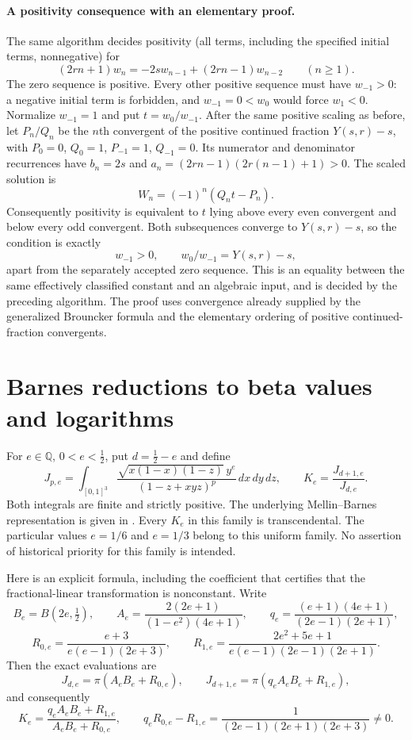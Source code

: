 \documentclass[11pt,a4paper]{article}
\theoremstyle{definition}
\theoremstyle{remark}
\numberwithin{equation}{section}
\begin{document}
\paragraph{A positivity consequence with an elementary proof.}
The same algorithm decides positivity (all terms, including the specified
initial terms, nonnegative) for
\[
 (2rn+1)w_n=-2s w_{n-1}+(2rn-1)w_{n-2}\qquad(n\geq1).
\]
The zero sequence is positive. Every other positive sequence must have
$w_{-1}>0$: a negative initial term is forbidden, and $w_{-1}=0<w_0$
would force $w_1<0$. Normalize $w_{-1}=1$ and put $t=w_0/w_{-1}$.
After the same positive scaling as before, let $P_n/Q_n$ be the $n$th
convergent of the positive continued fraction $Y(s,r)-s$, with
$P_0=0$, $Q_0=1$, $P_{-1}=1$, $Q_{-1}=0$. Its numerator and denominator
recurrences have $b_n=2s$ and
$a_n=(2rn-1)(2r(n-1)+1)>0$.
The scaled solution is
\[
 W_n=(-1)^n(Q_nt-P_n).
\]
Consequently positivity is equivalent to $t$ lying above every even
convergent and below every odd convergent. Both subsequences converge
to $Y(s,r)-s$, so the condition is exactly
\[
 w_{-1}>0,\qquad w_0/w_{-1}=Y(s,r)-s,
\]
apart from the separately accepted zero sequence. This is an equality
between the same effectively classified constant and an algebraic input,
and is decided by the preceding algorithm. The proof uses convergence
already supplied by the generalized Brouncker formula and the elementary
ordering of positive continued-fraction convergents.


\section{Barnes reductions to beta values and logarithms}
\label{fields-sec:barnes-family}

For $e\in\mathbb Q$, $0<e<\tfrac12$, put $d=\tfrac12-e$ and define
\[
 J_{p,e}=\int_{[0,1]^3}
 \frac{\sqrt{x(1-x)(1-z)}\,y^e}
 {(1-z+xyz)^p}\,dx\,dy\,dz,
 \qquad K_e=\frac{J_{d+1,e}}{J_{d,e}}.
\]
Both integrals are finite and strictly positive. The underlying
Mellin--Barnes representation is given in \cite{extra8-zudilin}.  Every $K_e$ in this
family is transcendental.  The particular values $e=1/6$ and $e=1/3$ belong to this uniform family.  No assertion of historical
priority for this family is intended.

Here is an explicit formula, including the coefficient that certifies
that the fractional-linear transformation is nonconstant.  Write
\[
 B_e=B(2e,\tfrac12),\qquad
 A_e=\frac{2(2e+1)}{(1-e^2)(4e+1)},\qquad
 q_e=\frac{(e+1)(4e+1)}{(2e-1)(2e+1)},
\]
\[
 R_{0,e}=\frac{e+3}{e(e-1)(2e+3)},\qquad
 R_{1,e}=\frac{2e^2+5e+1}{e(e-1)(2e-1)(2e+1)}.
\]
Then the exact evaluations are
\begin{equation}
 J_{d,e}=\pi(A_e B_e+R_{0,e}),\qquad
 J_{d+1,e}=\pi(q_e A_e B_e+R_{1,e}),
 \label{fields-eq:barnes-family-evaluations}
\end{equation}
and consequently
\begin{equation}
 K_e=\frac{q_e A_e B_e+R_{1,e}}{A_e B_e+R_{0,e}},
 \qquad
 q_eR_{0,e}-R_{1,e}
 =\frac{1}{(2e-1)(2e+1)(2e+3)}\ne0.
 \label{fields-eq:barnes-family-ratio}
\end{equation}
\end{document}
